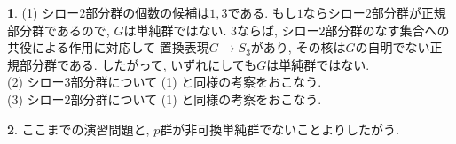 \documentclass{article}
\theoremstyle{definition}
\newtheorem{ans}{}
\numberwithin{ans}{subsection}
\begin{document}
\begin{ans}
  (1) シロー$2$部分群の個数の候補は$1, 3$である. もし$1$ならシロー$2$部分群が正規部分群であるので,
  $G$は単純群ではない. $3$ならば, シロー$2$部分群のなす集合への共役による作用に対応して
  置換表現$G \rightarrow S_3$があり, その核は$G$の自明でない正規部分群である.
  したがって, いずれにしても$G$は単純群ではない.\\
  (2) シロー$3$部分群について (1) と同様の考察をおこなう.\\
  (3) シロー$2$部分群について (1) と同様の考察をおこなう.
\end{ans}

\begin{ans}
  ここまでの演習問題と, $p$群が非可換単純群でないことよりしたがう.
\end{ans}
\end{document}

